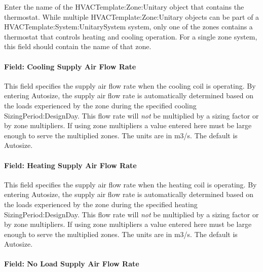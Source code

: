 Enter the name of the HVACTemplate:Zone:Unitary object that contains the thermostat. While multiple HVACTemplate:Zone:Unitary objects can be part of a HVACTemplate:System:UnitarySystem system, only one of the zones contains a thermostat that controls heating and cooling operation. For a single zone system, this field should contain the name of that zone.

\paragraph{Field: Cooling Supply Air Flow Rate}\label{field-cooling-supply-air-flow-rate-5}

This field specifies the supply air flow rate when the cooling coil is operating. By entering Autosize, the supply air flow rate is automatically determined based on the loads experienced by the zone during the specified cooling SizingPeriod:DesignDay. This flow rate will \emph{not} be multiplied by a sizing factor or by zone multipliers. If using zone multipliers a value entered here must be large enough to serve the multiplied zones. The units are in m3/s. The default is Autosize.

\paragraph{Field: Heating Supply Air Flow Rate}\label{field-heating-supply-air-flow-rate-5}

This field specifies the supply air flow rate when the heating coil is operating. By entering Autosize, the supply air flow rate is automatically determined based on the loads experienced by the zone during the specified heating SizingPeriod:DesignDay. This flow rate will \emph{not} be multiplied by a sizing factor or by zone multipliers. If using zone multipliers a value entered here must be large enough to serve the multiplied zones. The units are in m3/s. The default is Autosize.

\paragraph{Field: No Load Supply Air Flow Rate}\label{field-no-load-supply-air-flow-rate-4}

